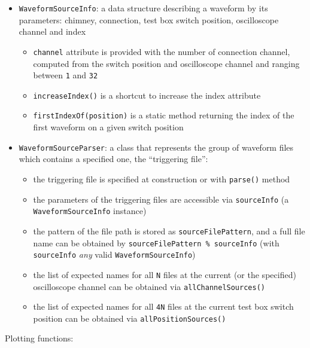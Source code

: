 \begin{itemize}
\tightlist
\item
  \texttt{WaveformSourceInfo}: a data structure describing a waveform by
  its parameters: chimney, connection, test box switch position,
  oscilloscope channel and index

  \begin{itemize}
  \tightlist
  \item
    \texttt{channel} attribute is provided with the number of connection
    channel, computed from the switch position and oscilloscope channel
    and ranging between \texttt{1} and \texttt{32}
  \item
    \texttt{increaseIndex()} is a shortcut to increase the index
    attribute
  \item
    \texttt{firstIndexOf(position)} is a static method returning the
    index of the first waveform on a given switch position
  \end{itemize}
\item
  \texttt{WaveformSourceParser}: a class that represents the group of
  waveform files which contains a specified one, the ``triggering
  file'':

  \begin{itemize}
  \tightlist
  \item
    the triggering file is specified at construction or with
    \texttt{parse()} method
  \item
    the parameters of the triggering files are accessible via
    \texttt{sourceInfo} (a \texttt{WaveformSourceInfo} instance)
  \item
    the pattern of the file path is stored as
    \texttt{sourceFilePattern}, and a full file name can be obtained by
    \texttt{sourceFilePattern\ \%\ sourceInfo} (with \texttt{sourceInfo}
    \emph{any} valid \texttt{WaveformSourceInfo})
  \item
    the list of expected names for all \texttt{N} files at the current
    (or the specified) oscilloscope channel can be obtained via
    \texttt{allChannelSources()}
  \item
    the list of expected names for all \texttt{4N} files at the current
    test box switch position can be obtained via
    \texttt{allPositionSources()}
  \end{itemize}
\end{itemize}

Plotting functions:

